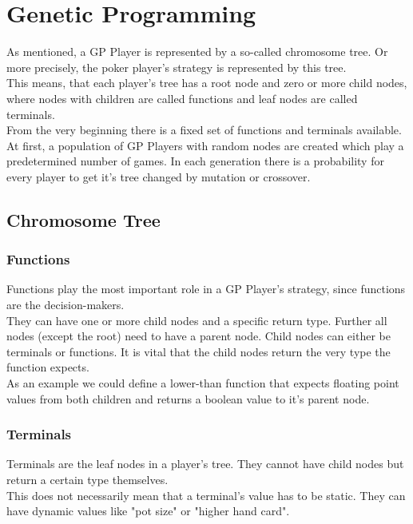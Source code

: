 \documentclass[12pt,fleqn,a4paper]{article}
\begin{document}
\newpage
\section{Genetic Programming}
\label{sec:genprog}
As mentioned, a GP Player is represented by a so-called chromosome tree. Or more precisely, the poker player's strategy is represented by this tree.\\
This means, that each player's tree has a root node and zero or more child nodes, where nodes with children are called functions and leaf nodes are called terminals.\\
From the very beginning there is a fixed set of functions and terminals available.
At first, a population of GP Players with random nodes are created which play a predetermined number of games.
In each generation there is a probability for every player to get it's tree changed by mutation or crossover.

\subsection{Chromosome Tree}
\subsubsection{Functions}
Functions play the most important role in a GP Player's strategy, since functions are the decision-makers.\\
They can have one or more child nodes and a specific return type. Further all nodes (except the root)  need to have a parent node.
Child nodes can either be terminals or functions. It is vital that the child nodes return the very type the function expects.\\
As an example we could define a lower-than function that expects floating point values from both children and returns a boolean value to it's parent node.

\subsubsection{Terminals}
Terminals are the leaf nodes in a player's tree. They cannot have child nodes but return a certain type themselves.\\
This does not necessarily mean that a terminal's value has to be static. They can have dynamic values like "pot size" or "higher hand card".
\end{document}
